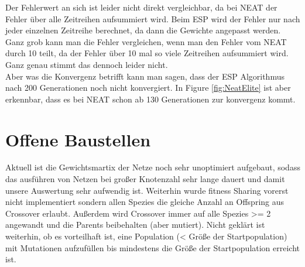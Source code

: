 \documentclass{hbrs-ecta-report}
\begin{document}
Der Fehlerwert an sich ist leider nicht direkt vergleichbar, da bei NEAT der Fehler über alle Zeitreihen aufsummiert wird. Beim ESP wird der Fehler nur nach jeder einzelnen Zeitreihe berechnet, da dann die Gewichte angepasst werden. Ganz grob kann man die Fehler vergleichen, wenn man den Fehler vom NEAT durch 10 teilt, da der Fehler über 10 mal so viele Zeitreihen aufsummiert wird. Ganz genau stimmt das dennoch leider nicht.\\
Aber was die Konvergenz betrifft kann man sagen, dass der ESP Algorithmus nach 200 Generationen noch nicht konvergiert. In Figure \ref{fig:NeatElite} ist aber erkennbar, dass es bei NEAT schon ab 130 Generationen zur konvergenz kommt.\\



\section{Offene Baustellen}
Aktuell ist die Gewichtsmartix der Netze noch sehr unoptimiert aufgebaut, sodass das ausführen von Netzen bei großer Knotenzahl sehr lange dauert und damit unsere Auswertung sehr aufwendig ist.
Weiterhin wurde fitness Sharing vorerst nicht implementiert sondern allen Spezies die gleiche Anzahl an Offspring aus Crossover erlaubt. Außerdem wird Crossover immer auf alle Spezies >= 2 angewandt und die Parents beibehalten (aber mutiert).
Nicht geklärt ist weiterhin, ob es vorteilhaft ist, eine Population (< Größe der Startpopulation) mit Mutationen aufzufüllen bis mindestens die Größe der Startpopulation erreicht ist.
\end{document}
